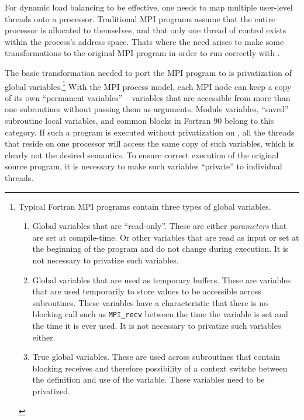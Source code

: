 \documentclass[10pt]{article}
\begin{document}
For dynamic load balancing to be effective, one needs to map multiple
user-level threads onto a processor. Traditional MPI programs assume that the
entire processor is allocated to themselves, and that only one thread of
control exists within the process's address space.  Thats where the need arises
to make some transformations to the original MPI program in order to run
correctly with \ampi{}.

The basic transformation needed to port the MPI program to \ampi{} is
privatization of global variables.\footnote{Typical Fortran MPI programs
contain three types of global variables.

\begin{enumerate}

\item Global variables that are ``read-only''. These are either
\emph{parameters} that are set at compile-time. Or other variables that are
read as input or set at the beginning of the program and do not change during
execution. It is not necessary to privatize such variables.

\item Global variables that are used as temporary buffers. These are variables
that are used temporarily to store values to be accessible across subroutines.
These variables have a characteristic that there is no blocking call such as
\texttt{MPI\_recv} between the time the variable is set and the time it is ever
used. It is not necessary to privatize such variables either. 

\item True global variables. These are used across subroutines that contain
blocking receives and therefore possibility of a context switche between the
definition and use of the variable. These variables need to be privatized.

\end{enumerate}
}
With the MPI process model, each MPI node can keep a copy of its own
``permanent variables'' -- variables that are accessible from more than one
subroutines without passing them as arguments.  Module variables, ``saved''
subroutine local variables, and common blocks in Fortran 90 belong to this
category. If such a program is executed without privatization on \ampi{}, all
the \ampi{} threads that reside on one processor will access the same copy of
such variables, which is clearly not the desired semantics.  To ensure correct
execution of the original source program, it is necessary to make such
variables ``private'' to individual threads.  
\end{document}

